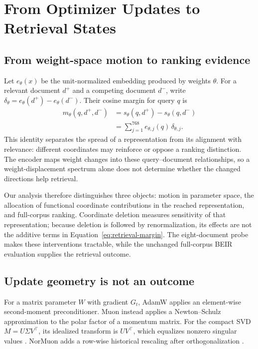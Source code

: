 \documentclass[11pt]{article}
\begin{document}
\section{From Optimizer Updates to Retrieval States}

\subsection{From weight-space motion to ranking evidence}

Let $e_\theta(x)$ be the unit-normalized embedding produced by weights $\theta$.
For a relevant document $d^+$ and a competing document $d^-$, write
$\delta_\theta=e_\theta(d^+)-e_\theta(d^-)$. Their cosine margin for query $q$ is
\begin{align}
m_\theta(q,d^+,d^-)
&=s_\theta(q,d^+)-s_\theta(q,d^-) \nonumber\\
&=\sum_{j=1}^{768} e_{\theta,j}(q)\,\delta_{\theta,j}.
\label{eq:retrieval-margin}
\end{align}
This identity separates the spread of a representation from its alignment with relevance:
different coordinates may reinforce or oppose a ranking distinction. The encoder maps weight
changes into these query--document relationships, so a weight-displacement spectrum alone does
not determine whether the changed directions help retrieval.

Our analysis therefore distinguishes three objects: motion in parameter space, the allocation of
functional coordinate contributions in the reached representation, and full-corpus ranking.
Coordinate deletion measures sensitivity of that representation; because deletion is followed by
renormalization, its effects are not the additive terms in Equation~\ref{eq:retrieval-margin}.
The eight-document probe makes these interventions tractable, while the unchanged full-corpus
BEIR evaluation supplies the retrieval outcome.

\subsection{Update geometry is not an outcome}

For a matrix parameter $W$ with gradient $G_t$, AdamW applies an element-wise second-moment
preconditioner. Muon instead applies a Newton--Schulz approximation to the polar factor of a momentum
matrix. For the compact SVD $M=U\Sigma V^\top$, its idealized transform is $UV^\top$, which equalizes
nonzero singular values \citep{jordan2024muon}. NorMuon adds a row-wise historical rescaling after
orthogonalization \citep{li2025normuon}.
\end{document}
